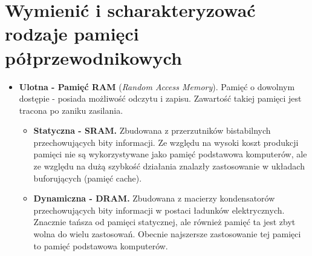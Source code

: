 \documentclass[12pt,a4paper]{article}
\begin{document}
	\section{Wymienić i scharakteryzować rodzaje pamięci półprzewodnikowych}
	\begin{itemize}
		\item \textbf{Ulotna - Pamięć RAM} (\textit{Random Access Memory}). Pamięć o dowolnym dostępie - posiada możliwość odczytu i zapisu. Zawartość takiej pamięci jest tracona po zaniku zasilania. 
		\begin{itemize}
			\item \textbf{Statyczna - SRAM.} Zbudowana z przerzutników bistabilnych przechowujących bity informacji. Ze względu na wysoki koszt produkcji pamięci nie są wykorzystywane jako pamięć podstawowa komputerów, ale ze względu na dużą szybkość działania znalazły zastosowanie w układach buforujących (pamięć cache). 
			\item \textbf{Dynamiczna - DRAM.} Zbudowana z macierzy kondensatorów przechowujących bity informacji w postaci ładunków elektrycznych. Znacznie tańsza od pamięci statycznej, ale również pamięć ta jest zbyt wolna do wielu zastosowań. Obecnie najszersze zastosowanie tej pamięci to pamięć podstawowa komputerów. 
		\end{itemize}
	\end{itemize}
\end{document}

